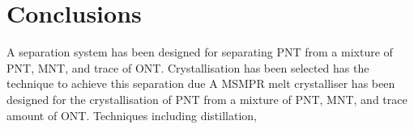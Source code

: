 \section{Conclusions}\label{separation conclusions}

A separation system has been designed for separating PNT from a mixture of PNT, MNT, and trace of ONT. Crystallisation has been selected has the technique to achieve this separation due  A MSMPR melt crystalliser has been designed for the crystallisation of PNT from a mixture of PNT, MNT, and trace amount of ONT. Techniques including distillation, 